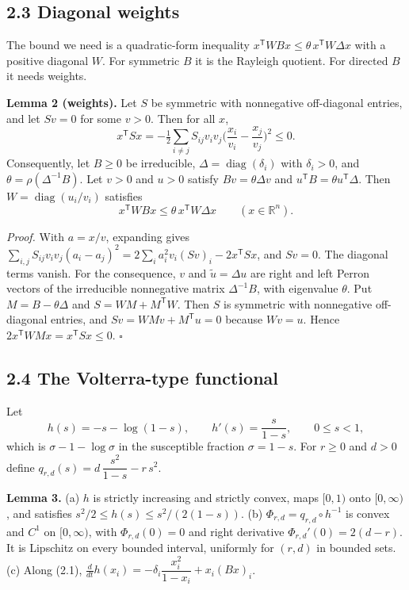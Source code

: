 \documentclass[
  11pt,
  a4paper,
]{article}
\begin{document}
\subsection{2.3 Diagonal weights}\label{diagonal-weights}

The bound we need is a quadratic-form inequality
\(x^{\mathsf T}WBx\le\theta\,x^{\mathsf T}W\Delta x\) with a positive
diagonal \(W\). For symmetric \(B\) it is the Rayleigh quotient. For
directed \(B\) it needs weights.

\textbf{Lemma 2 (weights).} Let \(S\) be symmetric with nonnegative
off-diagonal entries, and let \(Sv=0\) for some \(v>0\). Then for all
\(x\),
\[x^{\mathsf T}Sx=-\tfrac12\sum_{i\neq j}S_{ij}v_iv_j\Big(\frac{x_i}{v_i}-\frac{x_j}{v_j}\Big)^2\le0 .\]
Consequently, let \(B\ge0\) be irreducible,
\(\Delta=\operatorname{diag}(\delta_i)\) with \(\delta_i>0\), and
\(\theta=\rho(\Delta^{-1}B)\). Let \(v>0\) and \(u>0\) satisfy
\(Bv=\theta\Delta v\) and \(u^{\mathsf T}B=\theta u^{\mathsf T}\Delta\).
Then \(W=\operatorname{diag}(u_i/v_i)\) satisfies
\[x^{\mathsf T}WBx\le\theta\,x^{\mathsf T}W\Delta x\qquad(x\in\mathbb R^n). \tag{2.2}\]

\emph{Proof.} With \(a=x/v\), expanding gives
\(\sum_{i,j}S_{ij}v_iv_j(a_i-a_j)^2=2\sum_ia_i^2v_i(Sv)_i-2x^{\mathsf T}Sx\),
and \(Sv=0\). The diagonal terms vanish. For the consequence, \(v\) and
\(\tilde u=\Delta u\) are right and left Perron vectors of the
irreducible nonnegative matrix \(\Delta^{-1}B\), with eigenvalue
\(\theta\). Put \(M=B-\theta\Delta\) and \(S=WM+M^{\mathsf T}W\). Then
\(S\) is symmetric with nonnegative off-diagonal entries, and
\(Sv=WMv+M^{\mathsf T}u=0\) because \(Wv=u\). Hence
\(2x^{\mathsf T}WMx=x^{\mathsf T}Sx\le0\). \(\square\)

\subsection{2.4 The Volterra-type
functional}\label{the-volterra-type-functional}

Let
\[h(s)=-s-\log(1-s),\qquad h'(s)=\frac{s}{1-s},\qquad 0\le s<1, \tag{2.3}\]
which is \(\sigma-1-\log\sigma\) in the susceptible fraction
\(\sigma=1-s\). For \(r\ge0\) and \(d>0\) define
\(q_{r,d}(s)=d\,\dfrac{s^2}{1-s}-r\,s^2\).

\textbf{Lemma 3.} (a) \(h\) is strictly increasing and strictly convex,
maps \([0,1)\) onto \([0,\infty)\), and satisfies
\(s^2/2\le h(s)\le s^2/(2(1-s))\). (b)
\(\Phi_{r,d}=q_{r,d}\circ h^{-1}\) is convex and \(C^1\) on
\([0,\infty)\), with \(\Phi_{r,d}(0)=0\) and right derivative
\(\Phi_{r,d}'(0)=2(d-r)\). It is Lipschitz on every bounded interval,
uniformly for \((r,d)\) in bounded sets. (c) Along (2.1),
\(\frac{d}{dt}h(x_i)=-\delta_i\dfrac{x_i^2}{1-x_i}+x_i(Bx)_i\).
\end{document}
